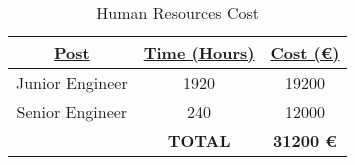 \begin{appendices}
\begin{table}[H]
\begin{tabular}{@{}ccc@{}}
\toprule
{\ul \textbf{Post}} & {\ul \textbf{Time (Hours)}} & {\ul \textbf{Cost (€)}} \\ \midrule
Junior Engineer     & 1920                        & 19200                   \\
Senior Engineer     & 240                         & 12000                   \\
                    & \textbf{TOTAL}              & \textbf{31200 €}
\end{tabular}
\caption{Human Resources Cost}
\label{wages}
\end{table}

\end{appendices}
%



